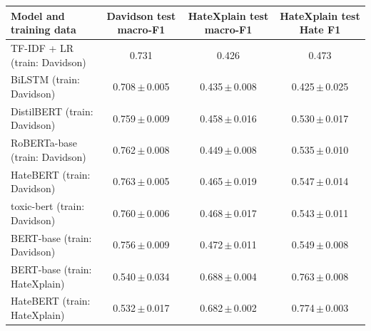 \begin{tabular}{lccc}
\toprule
Model and training data & Davidson test macro-F1 & HateXplain test macro-F1 & HateXplain test Hate F1 \\
\midrule
TF-IDF + LR (train: Davidson) & 0.731 & 0.426 & 0.473 \\
BiLSTM (train: Davidson) & 0.708\,$\pm$\,0.005 & 0.435\,$\pm$\,0.008 & 0.425\,$\pm$\,0.025 \\
DistilBERT (train: Davidson) & 0.759\,$\pm$\,0.009 & 0.458\,$\pm$\,0.016 & 0.530\,$\pm$\,0.017 \\
RoBERTa-base (train: Davidson) & 0.762\,$\pm$\,0.008 & 0.449\,$\pm$\,0.008 & 0.535\,$\pm$\,0.010 \\
HateBERT (train: Davidson) & 0.763\,$\pm$\,0.005 & 0.465\,$\pm$\,0.019 & 0.547\,$\pm$\,0.014 \\
toxic-bert (train: Davidson) & 0.760\,$\pm$\,0.006 & 0.468\,$\pm$\,0.017 & 0.543\,$\pm$\,0.011 \\
BERT-base (train: Davidson) & 0.756\,$\pm$\,0.009 & 0.472\,$\pm$\,0.011 & 0.549\,$\pm$\,0.008 \\
\midrule
BERT-base (train: HateXplain) & 0.540\,$\pm$\,0.034 & 0.688\,$\pm$\,0.004 & 0.763\,$\pm$\,0.008 \\
HateBERT (train: HateXplain) & 0.532\,$\pm$\,0.017 & 0.682\,$\pm$\,0.002 & 0.774\,$\pm$\,0.003 \\
\bottomrule
\end{tabular}
